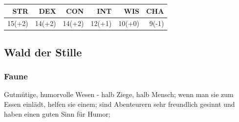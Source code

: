 \documentclass[11pt, twoside]{article}
\begin{document}
\begin{center}
\begin{tabular}{rrrrrr}
\textbf{STR} & \textbf{DEX} & \textbf{CON} & \textbf{INT} & \textbf{WIS} & \textbf{CHA}\\[0pt]
\hline
15(+2) & 14(+2) & 14(+2) & 12(+1) & 10(+0) & 9(-1)\\[0pt]
\end{tabular}
\end{center}

\newpage

\subsection{Wald der Stille}
\label{sec:orge675caf}
\subsubsection{Faune\label{faun}}
\label{sec:org6e68dbe}
Gutmütige, humorvolle Wesen - halb Ziege, halb Mensch; wenn man sie zum Essen einlädt, helfen sie einem; sind Abenteurern sehr freundlich gesinnt und haben einen guten Sinn für Humor;
\end{document}
